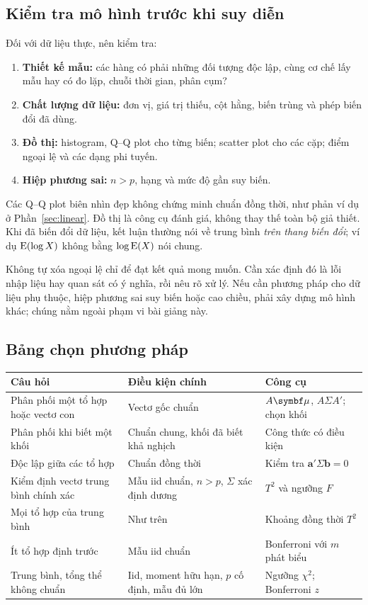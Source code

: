 \subsection{Kiểm tra mô hình trước khi suy diễn}
Đối với dữ liệu thực, nên kiểm tra:
\begin{enumerate}
 \item \textbf{Thiết kế mẫu:} các hàng có phải những đối tượng độc lập,
 cùng cơ chế lấy mẫu hay có đo lặp, chuỗi thời gian, phân cụm?
 \item \textbf{Chất lượng dữ liệu:} đơn vị, giá trị thiếu, cột hằng,
 biến trùng và phép biến đổi đã dùng.
 \item \textbf{Đồ thị:} histogram, Q--Q plot cho từng biến; scatter plot
 cho các cặp; điểm ngoại lệ và các dạng phi tuyến.
 \item \textbf{Hiệp phương sai:} $n>p$, hạng và mức độ gần suy biến.
\end{enumerate}
Các Q--Q plot biên nhìn đẹp không chứng minh chuẩn đồng thời, như phản
ví dụ ở Phần~\ref{sec:linear}. Đồ thị là công cụ đánh giá, không thay thế
toàn bộ giả thiết. Khi đã biến đổi dữ liệu, kết luận thường nói về trung
bình \emph{trên thang biến đổi}; ví dụ $\operatorname{E}(\log X)$ không bằng
$\log\operatorname{E}(X)$ nói chung.

Không tự xóa ngoại lệ chỉ để đạt kết quả mong muốn. Cần xác định đó là
lỗi nhập liệu hay quan sát có ý nghĩa, rồi nêu rõ xử lý. Nếu cần phương
pháp cho dữ liệu phụ thuộc, hiệp phương sai suy biến hoặc cao chiều, phải
xây dựng mô hình khác; chúng nằm ngoài phạm vi bài giảng này.

\subsection{Bảng chọn phương pháp}
\begin{center}
\small
\begin{tabular}{p{.30\linewidth}p{.30\linewidth}p{.31\linewidth}}
\toprule
Câu hỏi & Điều kiện chính & Công cụ\\
\midrule
Phân phối một tổ hợp hoặc vectơ con & Vectơ gốc chuẩn & $A\vmu$, $A\Sigma A'$; chọn khối\\
Phân phối khi biết một khối & Chuẩn chung, khối đã biết khả nghịch & Công thức có điều kiện\\
Độc lập giữa các tổ hợp & Chuẩn đồng thời & Kiểm tra $\mathbf a'\Sigma\mathbf b=0$\\
Kiểm định vectơ trung bình chính xác & Mẫu iid chuẩn, $n>p$, $\Sigma$ xác định dương & $T^2$ và ngưỡng $F$\\
Mọi tổ hợp của trung bình & Như trên & Khoảng đồng thời $T^2$\\
Ít tổ hợp định trước & Mẫu iid chuẩn & Bonferroni với $m$ phát biểu\\
Trung bình, tổng thể không chuẩn & Iid, moment hữu hạn, $p$ cố định, mẫu đủ lớn & Ngưỡng $\chi^2$; Bonferroni $z$\\
\bottomrule
\end{tabular}
\end{center}

